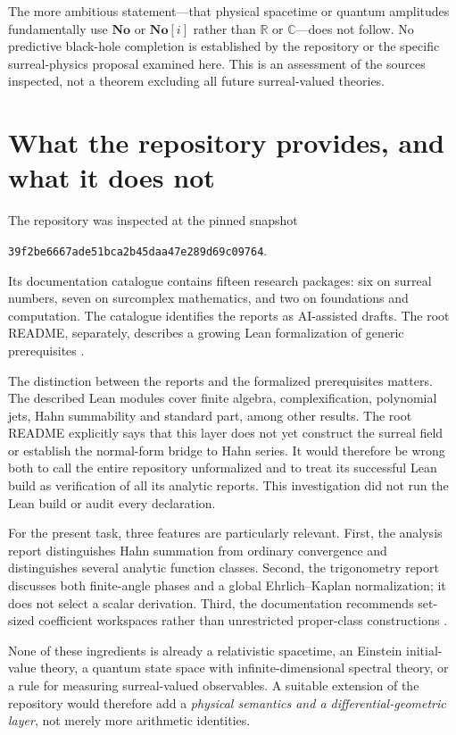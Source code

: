 \documentclass[11pt,a4paper]{article}
\numberwithin{equation}{section}
\theoremstyle{definition}
\theoremstyle{remark}
\newcommand{\R}{\mathbb R}
\newcommand{\C}{\mathbb C}
\newcommand{\No}{\mathbf{No}}
\begin{document}
The more ambitious statement---that physical spacetime or quantum amplitudes
fundamentally use $\No$ or $\No[i]$ rather than $\R$ or $\C$---does not follow.
No predictive black-hole completion is established by the repository or the
specific surreal-physics proposal examined here. This is an assessment of the
sources inspected, not a theorem excluding all future surreal-valued theories.

\section{What the repository provides, and what it does not}\label{sec:repo}

The repository was inspected at the pinned snapshot
\begin{center}
\small\texttt{39f2be6667ade51bca2b45daa47e289d69c09764}.
\end{center}
Its documentation catalogue contains fifteen research packages: six on surreal
numbers, seven on surcomplex mathematics, and two on foundations and computation.
The catalogue identifies the reports as AI-assisted drafts. The root README,
separately, describes a growing Lean formalization of generic prerequisites
\cite{RepoRoot,RepoDocs}.

The distinction between the reports and the formalized prerequisites matters.
The described Lean modules cover finite algebra, complexification, polynomial
jets, Hahn summability and standard part, among other results. The root README
explicitly says that this layer does not yet construct the surreal field or
establish the normal-form bridge to Hahn series. It would therefore be wrong
both to call the entire repository unformalized and to treat its successful
Lean build as verification of all its analytic reports. This investigation did
not run the Lean build or audit every declaration.

For the present task, three features are particularly relevant.
First, the analysis report distinguishes Hahn summation from ordinary
convergence and distinguishes several analytic function classes. Second, the
trigonometry report discusses both finite-angle phases and a global
Ehrlich--Kaplan normalization; it does not select a scalar derivation. Third,
the documentation recommends set-sized coefficient workspaces rather than
unrestricted proper-class constructions \cite{RepoAnalysis,RepoTrig,RepoDocs}.

None of these ingredients is already a relativistic spacetime, an Einstein
initial-value theory, a quantum state space with infinite-dimensional spectral
theory, or a rule for measuring surreal-valued observables. A suitable extension
of the repository would therefore add a \emph{physical semantics and a
differential-geometric layer}, not merely more arithmetic identities.
\end{document}

